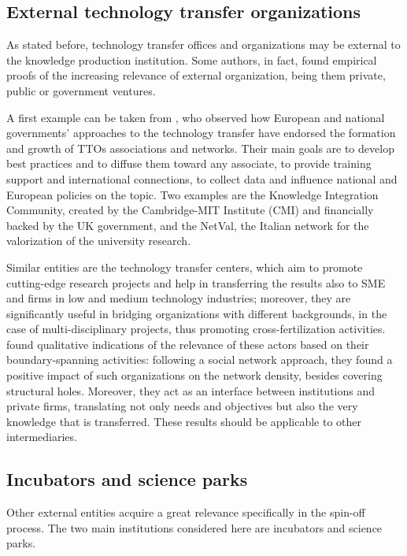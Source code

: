 \subsection{External technology transfer organizations}

As stated before, technology transfer offices and organizations may be external to the knowledge production institution. Some authors, in fact, found empirical proofs of the increasing relevance of external organization, being them private, public or government ventures.

A first example can be taken from \citet{Geuna2009}, who observed how European and national governments' approaches to the technology transfer have endorsed the formation and growth of TTOs associations and networks. Their main goals are to develop best practices and to diffuse them toward any associate, to provide training support and international connections, to collect data and influence national and European policies on the topic. Two examples are the Knowledge Integration Community, created by the Cambridge-MIT Institute (CMI) and financially backed by the UK government, and the NetVal, the Italian network for the valorization of the university research.

Similar entities are the technology transfer centers, which aim to promote cutting-edge research projects and help in transferring the results also to SME and firms in low and medium technology industries; moreover, they are significantly useful in bridging organizations with different backgrounds, in the case of multi-disciplinary projects, thus promoting cross-fertilization activities. \citet{Comacchio2012} found qualitative indications of the relevance of these actors based on their boundary-spanning activities: following a social network approach, they found a positive impact of such organizations on the network density, besides covering structural holes. Moreover, they act as an interface between institutions and private firms, translating not only needs and objectives but also the very knowledge that is transferred. These results should be applicable to other intermediaries.

\subsection{Incubators and science parks}
Other external entities acquire a great relevance specifically in the spin-off process. The two main institutions considered here are incubators and science parks. 

